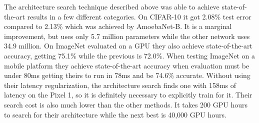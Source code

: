 \documentclass{ieee}
\begin{document}
The architecture search technique described above was able to achieve state-of-the-art results in a few different categories. On CIFAR-10 it got 2.08\% test error compared to 2.13\% which was achieved by AmoebaNet-B. It is a marginal improvement, but uses only 5.7 million parameters while the other network uses 34.9 million. On ImageNet evaluated on a GPU they also achieve state-of-the-art accuracy, getting 75.1\% while the previous is 72.0\%. When testing ImageNet on a mobile platform they achieve state-of-the-art accuracy when evaluation must be under 80ms getting theirs to run in 78ms and be 74.6\% accurate. Without using their latency regularization, the architecture search finds one with 158ms of latency on the Pixel 1, so it is definitely necessary to explicitly train for it. Their search cost is also much lower than the other methods. It takes 200 GPU hours to search for their architecture while the next best is 40,000 GPU hours. 


 
\end{document}
